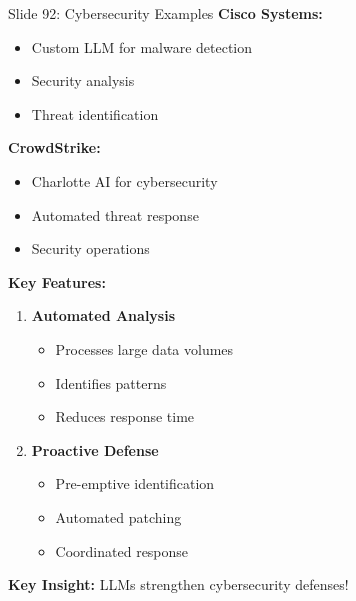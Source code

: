\documentclass[8pt]{beamer}
\begin{document}
	\begin{frame}{Slide 92: Cybersecurity Examples}
		\fontsize{6.5}{7.5}\selectfont
		\textbf{Cisco Systems:}
		\begin{itemize}
			\item Custom LLM for malware detection
			\item Security analysis
			\item Threat identification
		\end{itemize}
		
		\vspace{0.1cm}
		\textbf{CrowdStrike:}
		\begin{itemize}
			\item Charlotte AI for cybersecurity
			\item Automated threat response
			\item Security operations
		\end{itemize}
		
		\vspace{0.1cm}
		\textbf{Key Features:}
		\begin{enumerate}
			\item \textbf{Automated Analysis}
			\begin{itemize}
				\item Processes large data volumes
				\item Identifies patterns
				\item Reduces response time
			\end{itemize}
			\item \textbf{Proactive Defense}
			\begin{itemize}
				\item Pre-emptive identification
				\item Automated patching
				\item Coordinated response
			\end{itemize}
		\end{enumerate}
		
		\textcolor{myblue}{\textbf{Key Insight:}} LLMs strengthen cybersecurity defenses!
	\end{frame}
	
\end{document}
